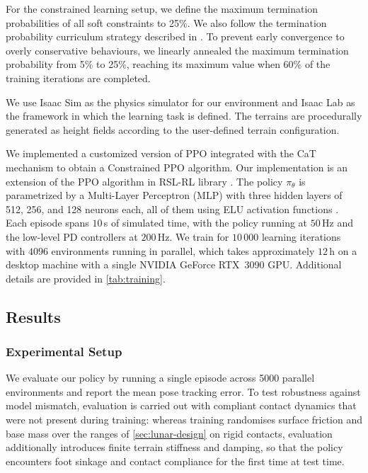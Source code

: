 For the constrained learning setup, we define the maximum termination probabilities of all soft constraints to 25\%. We also follow the termination probability curriculum strategy described in \citep{dadiotis2025dynamicobjectgoalpushing}. To prevent early convergence to overly conservative behaviours, we linearly annealed the maximum termination probability from 5\% to 25\%, reaching its maximum value when 60\% of the training iterations are completed.

We use Isaac Sim \citep{makoviychuk2021isaacgymhighperformance} as the physics simulator for our environment and Isaac Lab \citep{mittal2023orbit} as the framework in which the learning task is defined. The terrains are procedurally generated as height fields according to the user-defined terrain configuration. 

We implemented a customized version of PPO \citep{schulman2017proximalpolicyoptimizationalgorithms} integrated with the CaT mechanism to obtain a Constrained PPO algorithm. Our implementation is an extension of the PPO algorithm in RSL-RL library \citep{rudin2022learning}. The policy $\pi_{\theta}$ is parametrized by a Multi-Layer Perceptron (MLP) with three hidden layers of 512, 256, and 128 neurons each, all of them using ELU activation functions \citep{clevert2016fastaccuratedeepnetwork}. Each episode spans $10\,$s of simulated time, with the policy running at $50\,$Hz and the low-level PD controllers at $200\,$Hz. We train for $10\,000$ learning iterations with $4096$ environments running in parallel, which takes approximately $12\,$h on a desktop machine with a single NVIDIA GeForce RTX~3090 GPU. Additional details are provided in \cref{tab:training}.

\subsection{Results}

\subsubsection{Experimental Setup}

We evaluate our policy by running a single episode across 5000 parallel environments and report the mean pose tracking error. To test robustness against model mismatch, evaluation is carried out with compliant contact dynamics that were not present during training: whereas training randomises surface friction and base mass over the ranges of \cref{sec:lunar-design} on rigid contacts, evaluation additionally introduces finite terrain stiffness and damping, so that the policy encounters foot sinkage and contact compliance for the first time at test time. 

